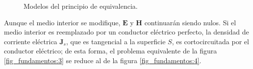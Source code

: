 \begin{figure} [H]
\centering 
{}
\hspace{0.5cm}
\caption{Modelos del principio de equivalencia.}
\label{grup_fig_fundamentos:2}
\end{figure}
Aunque el medio interior se modifique, $\mathbf{E}$ y $\mathbf{H}$ continuarán siendo nulos.  Si el medio interior es reemplazado por un conductor eléctrico perfecto, la densidad de corriente eléctrica $\mathbf{J}_s$, que es tangencial a la superficie $S$, es cortocircuitada por el conductor eléctrico; de esta forma, el problema equivalente de la figura \ref{fig_fundamentos:3} se reduce al de la figura \ref{fig_fundamentos:4}.

